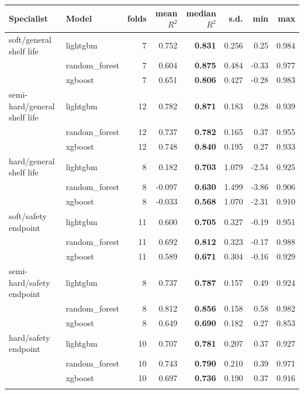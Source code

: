 \begin{tabular}{llrrrrrr}
\toprule
Specialist & Model & folds & mean $R^2$ & median $R^2$ & s.d. & min & max \\
\midrule
soft/general shelf life & lightgbm & 7 & 0.752 & \textbf{0.831} & 0.256 & 0.25 & 0.984 \\
 & random\_forest & 7 & 0.604 & \textbf{0.875} & 0.484 & -0.33 & 0.977 \\
 & xgboost & 7 & 0.651 & \textbf{0.806} & 0.427 & -0.28 & 0.983 \\
\addlinespace[2pt]
semi-hard/general shelf life & lightgbm & 12 & 0.782 & \textbf{0.871} & 0.183 & 0.28 & 0.939 \\
 & random\_forest & 12 & 0.737 & \textbf{0.782} & 0.165 & 0.37 & 0.955 \\
 & xgboost & 12 & 0.748 & \textbf{0.840} & 0.195 & 0.27 & 0.933 \\
\addlinespace[2pt]
hard/general shelf life & lightgbm & 8 & 0.182 & \textbf{0.703} & 1.079 & -2.54 & 0.925 \\
 & random\_forest & 8 & -0.097 & \textbf{0.630} & 1.499 & -3.86 & 0.906 \\
 & xgboost & 8 & -0.033 & \textbf{0.568} & 1.070 & -2.31 & 0.910 \\
\addlinespace[2pt]
soft/safety endpoint & lightgbm & 11 & 0.600 & \textbf{0.705} & 0.327 & -0.19 & 0.951 \\
 & random\_forest & 11 & 0.692 & \textbf{0.812} & 0.323 & -0.17 & 0.988 \\
 & xgboost & 11 & 0.589 & \textbf{0.671} & 0.304 & -0.16 & 0.929 \\
\addlinespace[2pt]
semi-hard/safety endpoint & lightgbm & 8 & 0.737 & \textbf{0.787} & 0.157 & 0.49 & 0.924 \\
 & random\_forest & 8 & 0.812 & \textbf{0.856} & 0.158 & 0.58 & 0.982 \\
 & xgboost & 8 & 0.649 & \textbf{0.690} & 0.182 & 0.27 & 0.853 \\
\addlinespace[2pt]
hard/safety endpoint & lightgbm & 10 & 0.707 & \textbf{0.781} & 0.207 & 0.37 & 0.927 \\
 & random\_forest & 10 & 0.743 & \textbf{0.790} & 0.210 & 0.39 & 0.971 \\
 & xgboost & 10 & 0.697 & \textbf{0.736} & 0.190 & 0.37 & 0.916 \\
\addlinespace[2pt]
\bottomrule
\end{tabular}